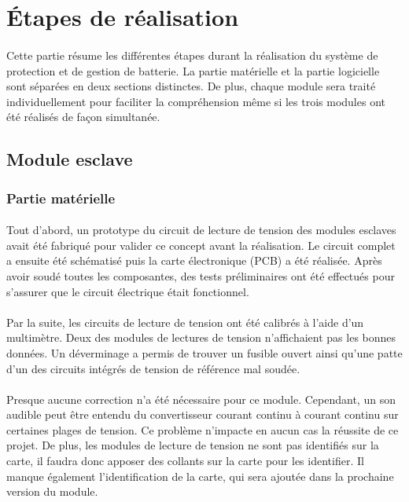 \section{Étapes de réalisation}

	\paragraph{}
	Cette partie résume les différentes étapes durant la réalisation du système de protection et de gestion de batterie. La partie matérielle et la partie logicielle sont séparées en deux sections distinctes. De plus, chaque module sera traité individuellement pour faciliter la compréhension même si les trois modules ont été réalisés de façon simultanée.

	\subsection{Module esclave}

		\subsubsection{Partie matérielle}

			\paragraph{}
			Tout d’abord, un prototype du circuit de lecture de tension des modules esclaves avait été fabriqué pour valider ce concept avant la réalisation. Le circuit complet a ensuite été schématisé puis la carte électronique (PCB) a été réalisée. Après avoir soudé toutes les composantes, des tests préliminaires ont été effectués pour s’assurer que le circuit électrique était fonctionnel.

			\paragraph{}
			Par la suite, les circuits de lecture de tension ont été calibrés à l’aide d’un multimètre. Deux des modules de lectures de tension n’affichaient pas les bonnes données. Un déverminage a permis de trouver un fusible ouvert ainsi qu'une patte d'un des circuits intégrés de tension de référence mal soudée.

			\paragraph{}
			Presque aucune correction n’a été nécessaire pour ce module. Cependant, un son audible peut être entendu du convertisseur courant continu à courant continu sur certaines plages de tension. Ce problème n’impacte en aucun cas la réussite de ce projet. De plus, les modules de lecture de tension ne sont pas identifiés sur la carte, il faudra donc apposer des collants sur la carte pour les identifier. Il manque également l’identification de la carte, qui sera ajoutée dans la prochaine version du module.

